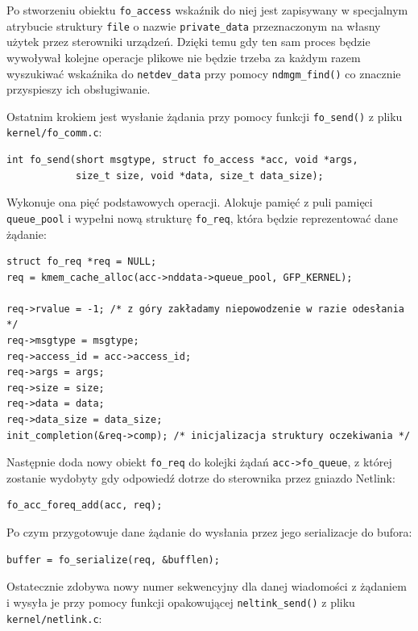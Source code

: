 \documentclass[11pt]{scrartcl}
\begin{document}
Po stworzeniu obiektu \texttt{fo\_access} wskaźnik do niej jest zapisywany w specjalnym atrybucie struktury \texttt{file} o nazwie \texttt{private\_data} przeznaczonym na własny użytek przez sterowniki urządzeń. Dzięki temu gdy ten sam proces będzie wywoływał kolejne operacje plikowe nie będzie trzeba za każdym razem wyszukiwać wskaźnika do \texttt{netdev\_data} przy pomocy \texttt{ndmgm\_find()} co znacznie przyspieszy ich obsługiwanie.

Ostatnim krokiem jest wysłanie żądania przy pomocy funkcji \texttt{fo\_send()} z pliku \texttt{kernel/fo\_comm.c}:

\begin{verbatim}
int fo_send(short msgtype, struct fo_access *acc, void *args,
            size_t size, void *data, size_t data_size);
\end{verbatim}

Wykonuje ona pięć podstawowych operacji. Alokuje pamięć z puli pamięci \texttt{queue\_pool} i wypełni nową strukturę \texttt{fo\_req}, która będzie reprezentować dane żądanie:

\begin{verbatim}
struct fo_req *req = NULL;
req = kmem_cache_alloc(acc->nddata->queue_pool, GFP_KERNEL);

req->rvalue = -1; /* z góry zakładamy niepowodzenie w razie odesłania */
req->msgtype = msgtype;
req->access_id = acc->access_id;
req->args = args;
req->size = size;
req->data = data;
req->data_size = data_size;
init_completion(&req->comp); /* inicjalizacja struktury oczekiwania */
\end{verbatim}

Następnie doda nowy obiekt \texttt{fo\_req} do kolejki żądań \texttt{acc-\textgreater{}fo\_queue}, z której zostanie wydobyty gdy odpowiedź dotrze do sterownika przez gniazdo Netlink:

\begin{verbatim}
fo_acc_foreq_add(acc, req);
\end{verbatim}

Po czym przygotowuje dane żądanie do wysłania przez jego serializacje do bufora:

\begin{verbatim}
buffer = fo_serialize(req, &bufflen);
\end{verbatim}

Ostatecznie zdobywa nowy numer sekwencyjny dla danej wiadomości z żądaniem i wysyła je przy pomocy funkcji opakowującej \texttt{neltink\_send()} z pliku \texttt{kernel/netlink.c}:
\end{document}

